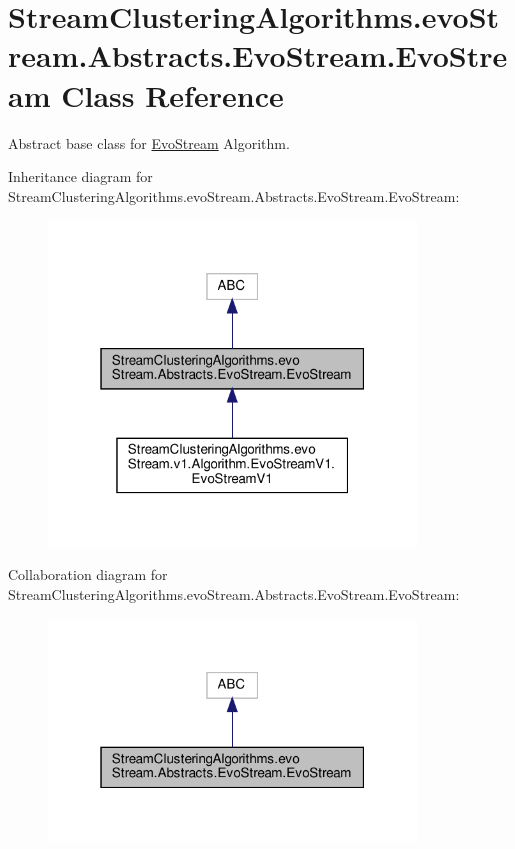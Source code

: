 \hypertarget{classStreamClusteringAlgorithms_1_1evoStream_1_1Abstracts_1_1EvoStream_1_1EvoStream}{}\section{Stream\+Clustering\+Algorithms.\+evo\+Stream.\+Abstracts.\+Evo\+Stream.\+Evo\+Stream Class Reference}
\label{classStreamClusteringAlgorithms_1_1evoStream_1_1Abstracts_1_1EvoStream_1_1EvoStream}


Abstract base class for \hyperlink{classStreamClusteringAlgorithms_1_1evoStream_1_1Abstracts_1_1EvoStream_1_1EvoStream}{Evo\+Stream} Algorithm.  




Inheritance diagram for Stream\+Clustering\+Algorithms.\+evo\+Stream.\+Abstracts.\+Evo\+Stream.\+Evo\+Stream\+:\nopagebreak
\begin{figure}[H]
\begin{center}
\leavevmode
\includegraphics[width=277pt]{classStreamClusteringAlgorithms_1_1evoStream_1_1Abstracts_1_1EvoStream_1_1EvoStream__inherit__graph}
\end{center}
\end{figure}


Collaboration diagram for Stream\+Clustering\+Algorithms.\+evo\+Stream.\+Abstracts.\+Evo\+Stream.\+Evo\+Stream\+:\nopagebreak
\begin{figure}[H]
\begin{center}
\leavevmode
\includegraphics[width=277pt]{classStreamClusteringAlgorithms_1_1evoStream_1_1Abstracts_1_1EvoStream_1_1EvoStream__coll__graph}
\end{center}
\end{figure}
